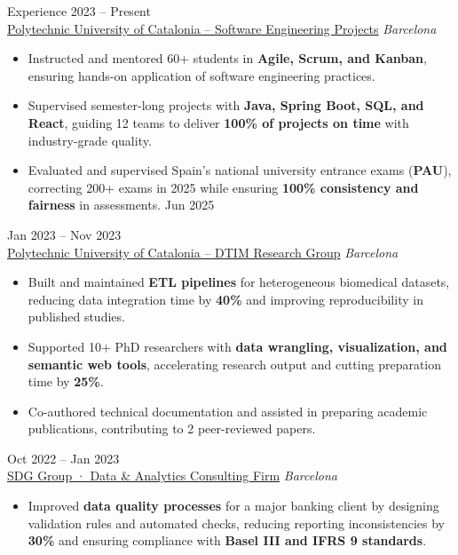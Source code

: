 \documentclass{resume} %
\begin{document}
\begin{rSection}{Experience}
 \hfill 2023 – Present \\
\href{https://www.fib.upc.edu/en/studies/bachelors-degrees/bachelor-degree-informatics-engineering/curriculum/syllabus/PES}{Polytechnic University of Catalonia – Software Engineering Projects} \hfill \textit{Barcelona}
\vspace{-0.5em}
\begin{itemize}
    \itemsep -3pt {}
    \item Instructed and mentored 60+ students in \textbf{Agile, Scrum, and Kanban}, ensuring hands-on application of software engineering practices.
    \item Supervised semester-long projects with \textbf{Java, Spring Boot, SQL, and React}, guiding 12 teams to deliver \textbf{100\% of projects on time} with industry-grade quality.
    \item Evaluated and supervised Spain’s national university entrance exams (\textbf{PAU}), correcting 200+ exams in 2025 while ensuring \textbf{100\% consistency and fairness} in assessments. \hfill Jun 2025
\end{itemize}

 \hfill Jan 2023 – Nov 2023 \\
\href{https://www.essi.upc.edu/dtim/}{Polytechnic University of Catalonia – DTIM Research Group} \hfill \textit{Barcelona}
\vspace{-0.5em}
\begin{itemize}
    \itemsep -3pt {}
    \item Built and maintained \textbf{ETL pipelines} for heterogeneous biomedical datasets, reducing data integration time by \textbf{40\%} and improving reproducibility in published studies.
    \item Supported 10+ PhD researchers with \textbf{data wrangling, visualization, and semantic web tools}, accelerating research output and cutting preparation time by \textbf{25\%}.
    \item Co-authored technical documentation and assisted in preparing academic publications, contributing to 2 peer-reviewed papers.
\end{itemize}

 \hfill Oct 2022 – Jan 2023 \\
\href{https://www.sdggroup.com/}{SDG Group · Data \& Analytics Consulting Firm} \hfill \textit{Barcelona}
\vspace{-0.5em}
\begin{itemize}
    \itemsep -3pt {}
    \item Improved \textbf{data quality processes} for a major banking client by designing validation rules and automated checks, reducing reporting inconsistencies by \textbf{30\%} and ensuring compliance with \textbf{Basel III and IFRS 9 standards}.
\end{itemize}
\end{rSection}
\end{document}
